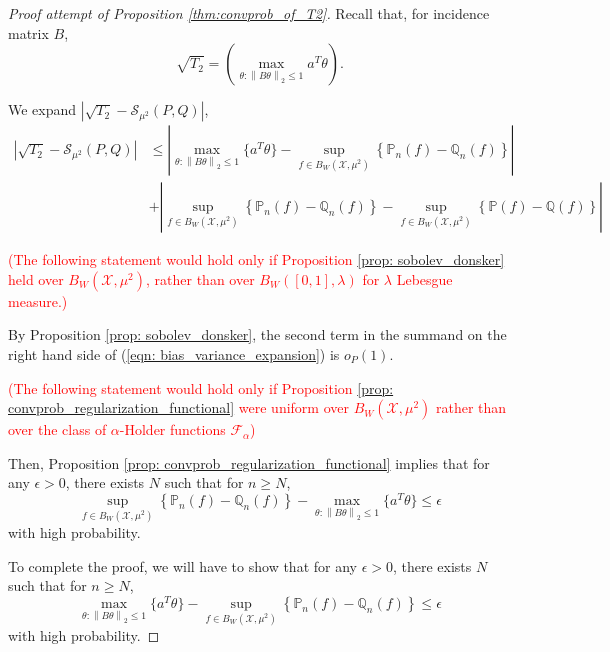 \documentclass{article}
\newcommand{\norm}[1]{\left\lVert#1\right\rVert}
\newcommand{\abs}[1]{\left \lvert #1 \right \rvert}
\newcommand{\F}{\mathcal{F}}
\newcommand{\X}{\mathcal{X}}
\theoremstyle{alden}
\theoremstyle{definition}
\theoremstyle{remark}
\begin{document}
\begin{proof}[Proof attempt of Proposition \ref{thm:convprob_of_T2}]
	Recall that, for incidence matrix $B$, 
	\begin{equation*}
	\sqrt{T_2} = \left(\max_{\theta: \norm{B\theta}_2 \leq 1} a^T \theta \right).
	\end{equation*}
	
	We expand $\abs{\sqrt{T_2} - \mathcal{S}_{\mu^2}(P,Q)}$,
	\begin{align}
	\label{eqn: bias_variance_expansion}
	\abs{\sqrt{T_2} - \mathcal{S}_{\mu^2}(P,Q)} & \leq \abs{\max_{\theta: \norm{B\theta}_2 \leq 1} \bigl\{a^T \theta \bigr\} - \sup_{f \in B_W(\X, \mu^2)} \left\{ \mathbb{P}_n(f) - \mathbb{Q}_n(f) \right\} } \nonumber \\
	& + \abs{\sup_{f \in B_W(\X, \mu^2)} \left\{ \mathbb{P}_n(f) - \mathbb{Q}_n(f) \right\} - \sup_{f \in B_W(\X, \mu^2)} \left\{ \mathbb{P}(f) - \mathbb{Q}(f) \right\} }
	\end{align}
	
	\textcolor{red}{(The following statement would hold only if Proposition \ref{prop: sobolev_donsker} held over $B_W(\X, \mu^2)$, rather than over $B_W([0,1], \lambda)$ for $\lambda$ Lebesgue measure.)}
	
	By Proposition \ref{prop: sobolev_donsker}, the second term in the summand on the right hand side of (\ref{eqn: bias_variance_expansion}) is $o_P(1)$.
	
	\textcolor{red}{(The following statement would hold only if Proposition \ref{prop: convprob_regularization_functional} were uniform over $B_W(\X, \mu^2)$ rather than over the class of $\alpha$-Holder functions $\F_{\alpha}$)}
	
	Then, Proposition \ref{prop: convprob_regularization_functional} implies that for any $\epsilon > 0$, there exists $N$ such that for $n \geq N$, 
	\begin{equation*}
	\sup_{f \in B_W(\X, \mu^2)} \left\{ \mathbb{P}_n(f) - \mathbb{Q}_n(f) \right\} - \max_{\theta: \norm{B\theta}_2 \leq 1} \bigl\{a^T \theta \bigr\} \leq \epsilon
	\end{equation*}
	with high probability. 
	
	To complete the proof, we will have to show that for any $\epsilon > 0$, there exists $N$ such that for $n \geq N$, 
	\begin{equation*}
	\max_{\theta: \norm{B\theta}_2 \leq 1} \bigl\{a^T \theta \bigr\} - \sup_{f \in B_W(\X, \mu^2)} \left\{ \mathbb{P}_n(f) - \mathbb{Q}_n(f) \right\} \leq \epsilon
	\end{equation*}
	with high probability.
\end{proof}
\end{document}
